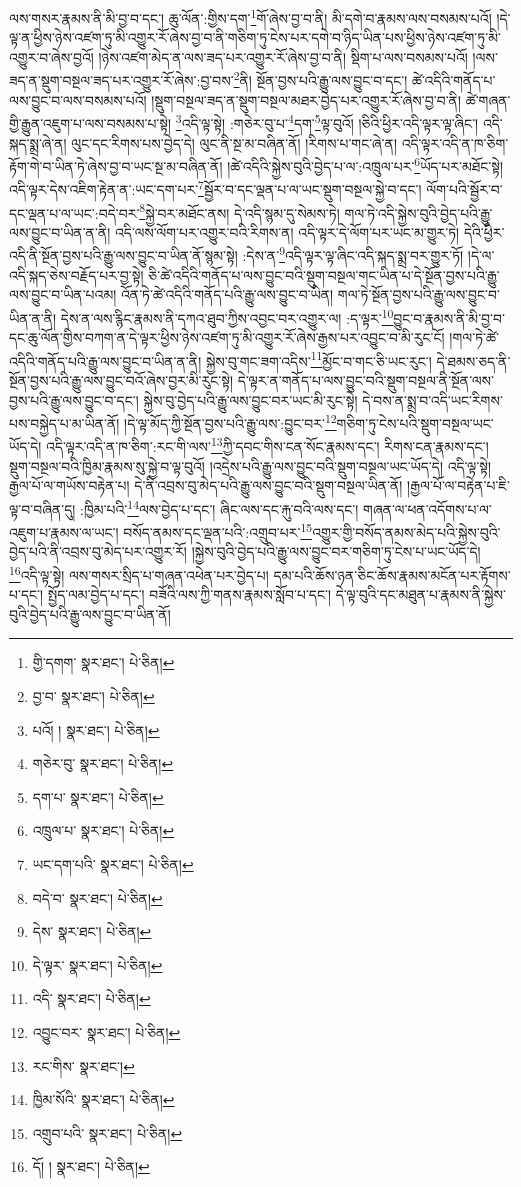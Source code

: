 ལས་གསར་རྣམས་ནི་མི་བྱ་བ་དང་། ཆུ་ལོན་:གྱིས་དག་\footnote{གྱི་དགག་  སྣར་ཐང་།  པེ་ཅིན། }གོ་ཞེས་བྱ་བ་ནི། མི་དགེ་བ་རྣམས་ལས་བསམས་པའོ། །དེ་ལྟ་ན་ཕྱིས་ཉེས་འཛག་ཏུ་མི་འགྱུར་རོ་ཞེས་བྱ་བ་ནི་གཅིག་ཏུ་ངེས་པར་དགེ་བ་ཉིད་ཡིན་པས་ཕྱིས་ཉེས་འཛག་ཏུ་མི་འགྱུར་བ་ཞེས་བྱའོ། །ཉེས་འཛག་མེད་ན་ལས་ཟད་པར་འགྱུར་རོ་ཞེས་བྱ་བ་ནི། སྡིག་པ་ལས་བསམས་པའོ། །ལས་ཟད་ན་སྡུག་བསྔལ་ཟད་པར་འགྱུར་རོ་ཞེས་:བྱ་བས་\footnote{བྱ་བ་  སྣར་ཐང་།  པེ་ཅིན། }ནི། སྔོན་བྱས་པའི་རྒྱུ་ལས་བྱུང་བ་དང་། ཚེ་འདིའི་གནོད་པ་ལས་བྱུང་བ་ལས་བསམས་པའོ། །སྡུག་བསྔལ་ཟད་ན་སྡུག་བསྔལ་མཐར་བྱེད་པར་འགྱུར་རོ་ཞེས་བྱ་བ་ནི། ཚེ་གཞན་གྱི་རྒྱུན་འཇུག་པ་ལས་བསམས་པ་སྟེ། \footnote{པའོ། །   སྣར་ཐང་།  པེ་ཅིན། }འདི་ལྟ་སྟེ། :གཅེར་བུ་པ་\footnote{གཅེར་བུ་  སྣར་ཐང་།  པེ་ཅིན། }དག་\footnote{དག་པ་  སྣར་ཐང་།  པེ་ཅིན། }ལྟ་བུའོ། །ཅིའི་ཕྱིར་འདི་ལྟར་ལྟ་ཞིང་། འདི་སྐད་སྨྲ་ཞེ་ན། ལུང་དང་རིགས་པས་བྱེད་དེ། ལུང་ནི་སྔ་མ་བཞིན་ནོ། །རིགས་པ་གང་ཞེ་ན། འདི་ལྟར་འདི་ན་ཁ་ཅིག་རྟོག་གེ་བ་ཡིན་ཏེ་ཞེས་བྱ་བ་ཡང་སྔ་མ་བཞིན་ནོ། །ཚེ་འདིའི་སྐྱེས་བུའི་བྱེད་པ་ལ་:འཁྲུལ་པར་\footnote{འཁྲུལ་པ་  སྣར་ཐང་།  པེ་ཅིན། }ཡོད་པར་མཐོང་སྟེ། འདི་ལྟར་དེས་འཇིག་རྟེན་ན་:ཡང་དག་པར་\footnote{ཡང་དག་པའི་  སྣར་ཐང་།  པེ་ཅིན། }སྦྱོར་བ་དང་ལྡན་པ་ལ་ཡང་སྡུག་བསྔལ་སྐྱེ་བ་དང་། ལོག་པའི་སྦྱོར་བ་དང་ལྡན་པ་ལ་ཡང་:བདེ་བར་\footnote{བདེ་བ་  སྣར་ཐང་།  པེ་ཅིན། }སྐྱེ་བར་མཐོང་ནས། དེ་འདི་སྙམ་དུ་སེམས་ཏེ། གལ་ཏེ་འདི་སྐྱེས་བུའི་བྱེད་པའི་རྒྱུ་ལས་བྱུང་བ་ཡིན་ན་ནི། འདི་ལས་ལོག་པར་འགྱུར་བའི་རིགས་ན། འདི་ལྟར་དེ་ལོག་པར་ཡང་མ་གྱུར་ཏེ། དེའི་ཕྱིར་འདི་ནི་སྔོན་བྱས་པའི་རྒྱུ་ལས་བྱུང་བ་ཡིན་ནོ་སྙམ་སྟེ། :དེས་ན་\footnote{དེས་  སྣར་ཐང་།  པེ་ཅིན། }འདི་ལྟར་ལྟ་ཞིང་འདི་སྐད་སྨྲ་བར་གྱུར་ཏོ། །དེ་ལ་འདི་སྐད་ཅེས་བརྗོད་པར་བྱ་སྟེ། ཅི་ཚེ་འདིའི་གནོད་པ་ལས་བྱུང་བའི་སྡུག་བསྔལ་གང་ཡིན་པ་དེ་སྔོན་བྱས་པའི་རྒྱུ་ལས་བྱུང་བ་ཡིན་པའམ། འོན་ཏེ་ཚེ་འདིའི་གནོད་པའི་རྒྱུ་ལས་བྱུང་བ་ཡིན། གལ་ཏེ་སྔོན་བྱས་པའི་རྒྱུ་ལས་བྱུང་བ་ཡིན་ན་ནི། དེས་ན་ལས་རྙིང་རྣམས་ནི་དཀའ་ཐུབ་ཀྱིས་འབྱང་བར་འགྱུར་ལ། :ད་ལྟར་\footnote{དེ་ལྟར་  སྣར་ཐང་།  པེ་ཅིན། }བྱུང་བ་རྣམས་ནི་མི་བྱ་བ་དང་ཆུ་ལོན་གྱིས་བཀག་ན་དེ་ལྟར་ཕྱིས་ཉེས་འཛག་ཏུ་མི་འགྱུར་རོ་ཞེས་རྒྱས་པར་འབྱུང་བ་མི་རུང་ངོ། །གལ་ཏེ་ཚེ་འདིའི་གནོད་པའི་རྒྱུ་ལས་བྱུང་བ་ཡིན་ན་ནི། སྐྱེས་བུ་གང་ཟག་འདིས་\footnote{འདི་  སྣར་ཐང་།  པེ་ཅིན། }མྱོང་བ་གང་ཅི་ཡང་རུང་། དེ་ཐམས་ཅད་ནི་སྔོན་བྱས་པའི་རྒྱུ་ལས་བྱུང་བའོ་ཞེས་བྱར་མི་རུང་སྟེ། དེ་ལྟར་ན་གནོད་པ་ལས་བྱུང་བའི་སྡུག་བསྔལ་ནི་སྔོན་ལས་བྱས་པའི་རྒྱུ་ལས་བྱུང་བ་དང་། སྐྱེས་བུ་བྱེད་པའི་རྒྱུ་ལས་བྱུང་བར་ཡང་མི་རུང་སྟེ། དེ་བས་ན་སྨྲ་བ་འདི་ཡང་རིགས་པས་བསྐྱེད་པ་མ་ཡིན་ནོ། །དེ་ལྟ་མོད་ཀྱི་སྔོན་བྱས་པའི་རྒྱུ་ལས་:བྱུང་བར་\footnote{འབྱུང་བར་  སྣར་ཐང་།  པེ་ཅིན། }གཅིག་ཏུ་ངེས་པའི་སྡུག་བསྔལ་ཡང་ཡོད་དེ། འདི་ལྟར་འདི་ན་ཁ་ཅིག་:རང་གི་ལས་\footnote{རང་གིས་  སྣར་ཐང་། }ཀྱི་དབང་གིས་ངན་སོང་རྣམས་དང་། རིགས་ངན་རྣམས་དང་། སྡུག་བསྔལ་བའི་ཁྱིམ་རྣམས་སུ་སྐྱེ་བ་ལྟ་བུའོ། །འདྲེས་པའི་རྒྱུ་ལས་བྱུང་བའི་སྡུག་བསྔལ་ཡང་ཡོད་དེ། འདི་ལྟ་སྟེ། རྒྱལ་པོ་ལ་གཡོས་བརྟེན་པ། དེ་ནི་འབྲས་བུ་མེད་པའི་རྒྱུ་ལས་བྱུང་བའི་སྡུག་བསྔལ་ཡིན་ནོ། །རྒྱལ་པོ་ལ་བརྟེན་པ་ཇི་ལྟ་བ་བཞིན་དུ། :ཁྱིམ་པའི་\footnote{ཁྱིམ་སོའི་  སྣར་ཐང་།  པེ་ཅིན། }ལས་བྱེད་པ་དང་། ཞིང་ལས་དང་རྐུ་བའི་ལས་དང་། གཞན་ལ་ཕན་འདོགས་པ་ལ་འཇུག་པ་རྣམས་ལ་ཡང་། བསོད་ནམས་དང་ལྡན་པའི་:འགྲུབ་པར་\footnote{འགྲུབ་པའི་  སྣར་ཐང་།  པེ་ཅིན། }འགྱུར་གྱི་བསོད་ནམས་མེད་པའི་སྐྱེས་བུའི་བྱེད་པའི་ནི་འབྲས་བུ་མེད་པར་འགྱུར་རོ། །སྐྱེས་བུའི་བྱེད་པའི་རྒྱུ་ལས་བྱུང་བར་གཅིག་ཏུ་ངེས་པ་ཡང་ཡོད་དེ། \footnote{དོ། །   སྣར་ཐང་།  པེ་ཅིན། }འདི་ལྟ་སྟེ། ལས་གསར་སྲིད་པ་གཞན་འཕེན་པར་བྱེད་པ། དམ་པའི་ཆོས་ཉན་ཅིང་ཆོས་རྣམས་མངོན་པར་རྟོགས་པ་དང་། སྤྱོད་ལམ་བྱེད་པ་དང་། བཟོའི་ལས་ཀྱི་གནས་རྣམས་སློབ་པ་དང་། དེ་ལྟ་བུའི་དང་མཐུན་པ་རྣམས་ནི་སྐྱེས་བུའི་བྱེད་པའི་རྒྱུ་ལས་བྱུང་བ་ཡིན་ནོ། 
